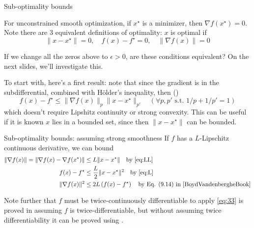 \documentclass[10pt,handout]{beamer}
\begin{document}
\begin{frame}{Sub-optimality bounds}

 For unconstrained smooth optimization, if $x^\star$ is a minimizer, then $\nabla f(x^\star) = 0$. Note there are 3 equivalent definitions of optimality: $x$ is optimal if
\begin{equation}
    \|x - x^\star\|=0, \quad
    f(x) - f^\star = 0, \quad
    \|\nabla f(x)\| = 0
\end{equation}

\medskip If we change all the zeros above to $\epsilon > 0$, are these conditions equivalent? 
On the next slides, we'll investigate this.

\medskip To start with, here's a first result: note that since the gradient is in the subdifferential, combined with H\"older's inequality, then (\cite[\S2.2.2]{Nesterov_2018})
\begin{equation}
    f(x)-f^\star \le \|\nabla f(x)\|_p \|x-x^\star\|_{p'}\quad (\forall p,p' \text{ s.t. } 1/p + 1/p' = 1 )
\end{equation}
which doesn't require Lipshitz continuity or strong convexity. This can be useful if it is known $x$ lies in a bounded set, since then $\|x-x^\star\|$ can be bounded.

\end{frame}

\begin{frame}{Sub-optimality bounds: assuming strong smoothness}
If $f$ has a $L$-Lipschitz continuous derivative, we can bound
\begin{align}
    \|\nabla f(x) \| = \| \nabla f(x) - \nabla f(x^\star)\| &\le L \|x-x^\star\| \quad \text{by \eqref{eq:LL}}\\
    f(x) - f^\star &\le \frac{L}{2}\|x-x^\star\|^2
    \quad\text{by \eqref{eq:L}} \\
    \|\nabla f(x) \|^2 &\le 2L \left( f(x) - f^\star\right) \quad\text{by Eq. (9.14) in \cite{BoydVandenbergheBook}} \label{eq:33}
\end{align}

Note further that $f$ must be twice-continuously differentiable to apply 
\eqref{eq:33} is proved in \cite{BoydVandenbergheBook} assuming $f$ is twice-differentiable, but without assuming twice differentiability it can be proved using \cite[Thm.\ 2.1.5, Eq.\ 2.1.10]{Nesterov_2018}.
    
\end{frame}
\end{document}
